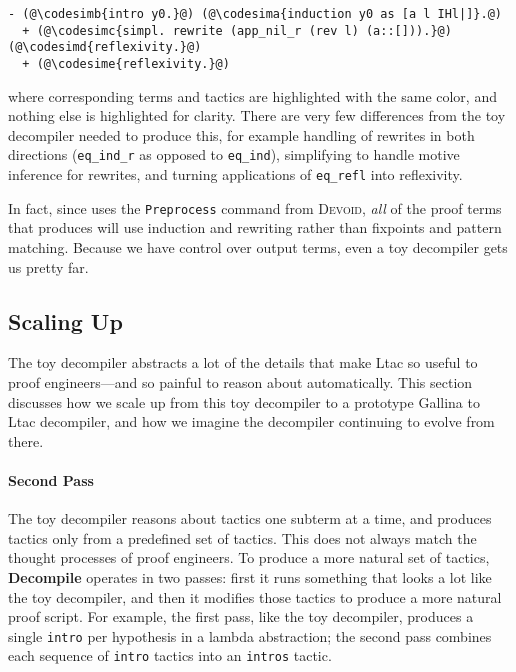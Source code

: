\begin{lstlisting}
- (@\codesimb{intro y0.}@) (@\codesima{induction y0 as [a l IHl|]}.@)
  + (@\codesimc{simpl. rewrite (app_nil_r (rev l) (a::[])).}@) (@\codesimd{reflexivity.}@)
  + (@\codesime{reflexivity.}@)
\end{lstlisting}
where corresponding terms and tactics are highlighted with the same color, and nothing else is highlighted for clarity.
There are very few differences from the toy decompiler needed to produce this,
for example handling of rewrites in both directions (\lstinline{eq_ind_r} as opposed to \lstinline{eq_ind}),
simplifying to handle motive inference for rewrites,
and turning applications of \lstinline{eq_refl} into reflexivity.

In fact, since \toolname uses the \lstinline{Preprocess} command from \textsc{Devoid}, \textit{all} of the proof terms that \toolname
produces will use induction and rewriting rather than fixpoints and pattern matching.
Because we have control over output terms, even a toy decompiler gets us pretty far.


\subsection{Scaling Up}
\label{sec:second}

The toy decompiler abstracts a lot of the details that make Ltac so useful to proof engineers---and so painful to 
reason about automatically.
This section discusses how we scale up from this toy decompiler to a prototype Gallina to Ltac decompiler,
and how we imagine the decompiler continuing to evolve from there.

\paragraph{Second Pass}
The toy decompiler reasons about tactics one subterm at a time, and produces tactics only from a predefined set of tactics.
This does not always match the thought processes of proof engineers.
To produce a more natural set of tactics, \textbf{Decompile} operates in two passes: first it runs something that looks a lot
like the toy decompiler, and then it modifies those tactics to produce a more natural proof script.
For example, the first pass, like the toy decompiler, produces a single \lstinline{intro} per hypothesis in a lambda abstraction;
the second pass combines each sequence of \lstinline{intro} tactics into an \lstinline{intros} tactic.

